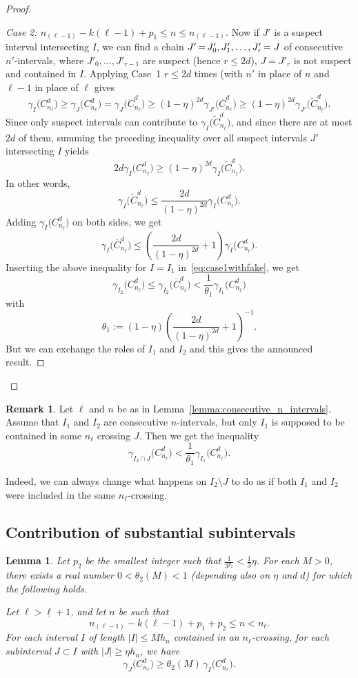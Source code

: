\documentclass[10pt]{amsart}
\newtheorem{lemm}[theo]{Lemma}\newtheorem{prop}[theo]{Proposition}\newtheorem{coro}[theo]{Corollary}\newtheorem{conj}[theo]{Conjecture}
\theoremstyle{definition}\newtheorem{defi}[theo]{Definition}\newtheorem{rema}[theo]{Remark}\newtheorem{exam}[theo]{Example}\newtheorem{exem}[theo]{Example}\newtheorem{nota}[theo]{Notation}
\newcommand{\egdef}{:=}
\newcommand{\cd}{C^{d}}
\newcommand{\lb}{\underline{\ell}}
\newcommand{\Gam}[1]{\gamma_{#1}\bigl(\cd_{n_{\lb}}\bigr)}
\newcommand{\Gamb}[1]{\gamma_{#1}\bigl(\overline{C}^d_{n_{\lb}}\bigr)}
\newcommand{\Gamt}[1]{\gamma_{#1}\bigl(\tilde{C}^d_{n_{\lb}}\bigr)}
\newcommand*{\Mk}{\mkern -2mu}
\begin{document}
\begin{proof}
\begin{proof}[Case 2: $n_{(\ell-1)}-k(\ell-1)+p_1\le n\le n_{(\ell-1)}$]
Now if $J'$ is a suspect interval intersecting $I$, we can find a chain $J'\Mk=\Mk J'_0,J'_1,\ldots,J'_{r}\Mk=J$ of consecutive $n'$-intervals, where $J'_0,\ldots,J'_{r-1}$ are suspect (hence $r\le 2d$), $J=J'_r$ is not suspect and contained in $I$. Applying Case~1 $r\le 2d$ times (with $n'$ in place of $n$ and $\ell-1$ in place of $\ell$ gives
\[
\Gam{I} \ge \Gam{J} = \Gamb{J} \ge (1-\eta)^{2d} \Gamb{J'} \ge (1-\eta)^{2d}\Gamt{J'}.
\]
Since only suspect intervals can contribute to $\Gamt{I}$, and since there are at most $2d$ of them, summing the preceding inequality over all suspect intervals $J'$ intersecting $I$ yields
\[
2d \Gam{I} \ge (1-\eta)^{2d}\Gamt{I}.
\]
In other words,
\[
\Gamt{I} \le \frac{2d}{(1-\eta)^{2d}} \Gam{I}.
\]
Adding $\Gam{I}$ on both sides, we get
\[
\Gamb{I} \le \left(\frac{2d}{(1-\eta)^{2d}} + 1 \right) \Gam{I}.
\]
Inserting the above inequality for $I=I_1$ in~\eqref{eq:case1withfake}, we get
\[
\Gam{I_2} \le \Gamb{I_2} < \frac{1}{\theta_1} \Gam{I_1}
\]
with
\[
\theta_1\egdef (1-\eta) \left(\frac{2d}{(1-\eta)^{2d}} + 1 \right)^{-1}.
\]
But we can exchange the roles of $I_1$ and $I_2$ and this gives the announced result.
\end{proof}
\let\qed\relax
\end{proof}

\begin{rema}\label{rem:extremities}
Let $\ell$ and $n$ be as in Lemma~\ref{lemma:consecutive_n_intervals}. Assume that $I_1$ and $I_2$ are consecutive $n$-intervals, but only $I_1$ is supposed to be contained in some $n_\ell$ crossing $J$. Then we get the inequality
\[
\Gam{I_2\cap J} < \frac{1}{\theta_1} \Gam{I_1}.
\]
\end{rema}

Indeed, we can always change what happens on $I_2\setminus J$ to do as if both $I_1$ and $I_2$ were included in the same $n_\ell$-crossing.


\subsection{Contribution of substantial subintervals}
\label{sec:4.2}

\begin{lemm}\label{lemma:ac}
Let $p_2$ be the smallest integer such that $\frac{1}{3^{p_2}}<\frac{1}{3}\eta$. For each $M>0$, there exists a real number $0<\theta_2(M)<1$ (depending also on $\eta$ and $d$) for which the following holds.

Let $\ell>\lb+1$, and let $n$ be such that
\begin{equation}\label{eq:condition_n}
n_{(\ell-1)} -k(\ell-1)+p_1+p_2 \le n < n_\ell.
\end{equation}
For each interval $I$ of length $|I|\le M h_n$ contained in an $n_\ell$-crossing, for each subinterval $J\subset I$ with $|J|\ge \eta h_n$, we have
\[
\Gam{J}\ge \theta_2(M)\, \Gam{I}.
\]
\end{lemm}
\end{document}
